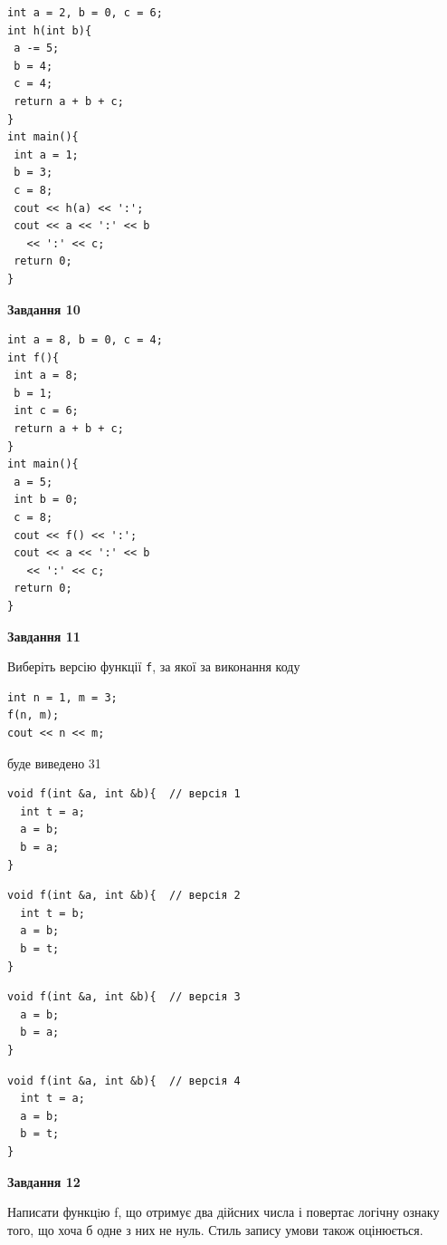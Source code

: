 \documentclass[12pt, ukrainian]{article}
\def\code#1{\Verb!#1!}
\begin{document}
{\begin {large}
\begin{minipage}[t]{7.0cm}
\begin{verbatim}
int a = 2, b = 0, c = 6;
int h(int b){
 a -= 5;
 b = 4;
 c = 4;
 return a + b + c;
}
int main(){
 int a = 1;
 b = 3;
 c = 8;
 cout << h(a) << ':';
 cout << a << ':' << b 
   << ':' << c;
 return 0;
}
\end{verbatim}



\begin{center}
\textbf{Завдання 10}
\end{center}
\vspace{-8mm}

\begin{verbatim}
int a = 8, b = 0, c = 4;
int f(){
 int a = 8;
 b = 1;
 int c = 6;
 return a + b + c;
}
int main(){
 a = 5;
 int b = 0;
 c = 8;
 cout << f() << ':';
 cout << a << ':' << b 
   << ':' << c;
 return 0;
}
\end{verbatim}

\end{minipage}
\vline \hspace{1mm}
\begin{minipage}[t]{11.0cm}

\begin{center}
\textbf{Завдання 11}
\end{center}
Виберіть версію функції \code{f}, за якої за виконання коду
\begin{verbatim}
int n = 1, m = 3;
f(n, m);
cout << n << m;
\end{verbatim}

буде виведено 31

\begin{verbatim}
void f(int &a, int &b){  // версія 1
  int t = a;
  a = b;
  b = a;
}
\end{verbatim}

\vspace{-8mm}\begin{verbatim}
void f(int &a, int &b){  // версія 2
  int t = b;
  a = b;
  b = t;
}
\end{verbatim}

\vspace{-8mm}\begin{verbatim}
void f(int &a, int &b){  // версія 3
  a = b;
  b = a;
}
\end{verbatim}

\vspace{-8mm}\begin{verbatim}
void f(int &a, int &b){  // версія 4
  int t = a;
  a = b;
  b = t;
}
\end{verbatim}



\begin{center}
\textbf{Завдання 12}
\end{center}

Написати функцiю f, що отримує два дійсних числа і повертає логічну ознаку того, що хоча б одне з них не нуль. Стиль запису умови також оцінюється.\par

\end{minipage}

\end {large}}
\newpage
\end{document}
